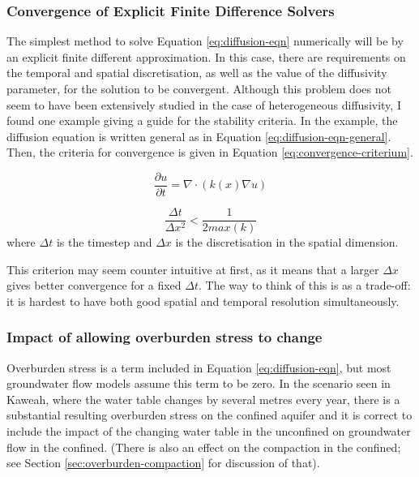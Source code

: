\documentclass{article}
\begin{document}
\subsubsection{Convergence of Explicit Finite Difference Solvers}

The simplest method to solve Equation \ref{eq:diffusion-eqn} numerically will be by an explicit finite different approximation. In this case, there are requirements on the temporal and spatial discretisation, as well as the value of the diffusivity parameter, for the solution to be convergent. Although this problem does not seem to have been extensively studied in the case of heterogeneous diffusivity, I found one example giving a guide for the stability criteria. In the example, the diffusion equation is written general as in Equation \ref{eq:diffusion-eqn-general}. Then, the criteria for convergence is given in Equation \ref{eq:convergence-criterium}.

\begin{equation}
\frac{\partial u}{\partial t} = \nabla \cdot (k(x) \nabla u)
\label{eq:diffusion-eqn-general}
\end{equation}

\begin{equation}
\frac{\Delta t}{\Delta x ^2} < \frac{1}{2 max(k)}
\label{eq:convergence-criterium}
\end{equation}
where $\Delta t$ is the timestep and $\Delta x$ is the discretisation in the spatial dimension.

This criterion may seem counter intuitive at first, as it means that a larger $\Delta x$ gives better convergence for a fixed $\Delta t$. The way to think of this is as a trade-off: it is hardest to have both good spatial and temporal resolution simultaneously.

\subsubsection{Impact of allowing overburden stress to change}
\label{sec:overburden-gwflow}

Overburden stress is a term included in Equation \ref{eq:diffusion-eqn}, but most groundwater flow models assume this term to be zero. In the scenario seen in Kaweah, where the water table changes by several metres every year, there is a substantial resulting overburden stress on the confined aquifer and it is correct to include the impact of the changing water table in the unconfined on groundwater flow in the confined. (There is also an effect on the compaction in the confined; see Section \ref{sec:overburden-compaction} for discussion of that).
\end{document}
